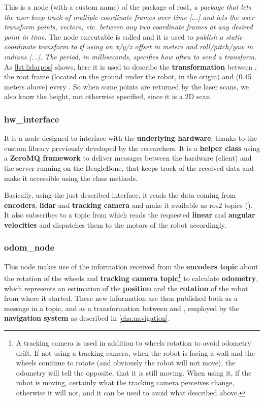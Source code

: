 This is a node (with a custom name) of the  package of \acrshort{ros}1, \textit{a package that lets the user keep track of multiple coordinate frames over time [...] and lets the user transform points, vectors, etc. between any two coordinate frames at any desired point in time}. \cite{tf} The node executable is called  and it is used to \textit{publish a static coordinate transform to tf using an x/y/z offset in meters and roll/pitch/yaw in radians [...]. The period, in milliseconds, specifies how often to send a transform}. \cite{tf} 
As \autoref{lst:lidarpos} shows, here it is used to describe the \textbf{transformation} between , the root frame (located on the ground under the robot, in the origin) and  (0.45 meters above) every . So when some points are returned by the laser scans, we also know the height, not otherwise specified, since it is a 2D scan.  

\subsubsection{hw\_interface}

It is a node designed to interface with the \textbf{underlying hardware}, thanks to the custom  library previously developed by the researchers. It is a \textbf{helper class} using a \textbf{ZeroMQ framework} to deliver messages between the hardware (client) and the server running on the BeagleBone, that keeps track of the received data and make it accessible using the class methods.

Basically, using the just described interface, it reads the data coming from \textbf{encoders}, \textbf{lidar} and \textbf{tracking camera} and make it available as \acrshort{ros}2 topics (). It also subscribes to a  topic from which reads the requested \textbf{linear} and \textbf{angular velocities} and dispatches them to the motors of the robot accordingly.

\subsubsection{odom\_node}

This node makes use of the information received from the \textbf{encoders topic} about the rotation of the wheels and \textbf{tracking camera topic}\footnote{A tracking camera is used in addition to wheels rotation to avoid odometry drift. If not using a tracking camera, when the robot is facing a wall and the wheels continue to rotate (and obviously the robot will not move), the odometry will tell the opposite, that it is still moving. When using it, if the robot is moving, certainly what the tracking camera perceives change, otherwise it will not, and it can be used to avoid what described above.} to calculate \textbf{odometry}, which represents an estimation of the \textbf{position} and the \textbf{rotation} of the robot from where it started. These new information are then published both as a message in a topic, and as a transformation between  and , employed by the \textbf{navigation system} as described in \autoref{cha:navigation}.